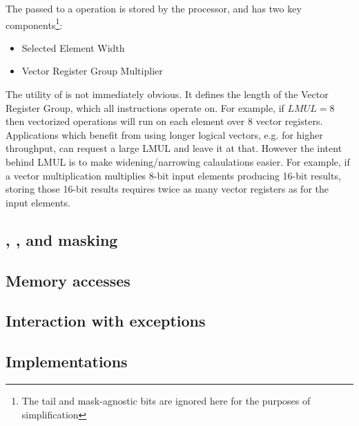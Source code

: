 The  passed to a  operation is stored by the processor, and has two key components\footnote{The tail and mask-agnostic bits are ignored here for the purposes of simplification}:
\begin{itemize}
    \item Selected Element Width 
    \item Vector Register Group Multiplier 
\end{itemize}


The utility of  is not immediately obvious.
It defines the length of the Vector Register Group, which all instructions operate on.
For example, if $LMUL = 8$ then vectorized operations will run on each element over 8 vector registers.
Applications which benefit from using longer logical vectors, e.g. for higher throughput, can request a large LMUL and leave it at that.
However the intent behind LMUL is to make widening/narrowing calaulations easier.
For example, if a vector multiplication multiplies 8-bit input elements producing 16-bit results, storing those 16-bit results requires twice as many vector registers as for the input elements.

\subsection{, , and masking}



\subsection{Memory accesses}

\subsection{Interaction with exceptions}

\subsection{Implementations}